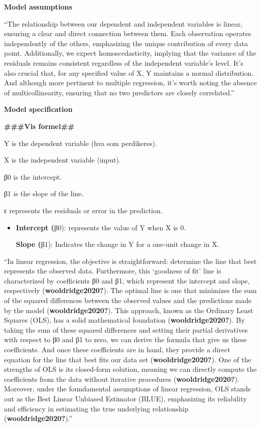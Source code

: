 \documentclass[
  a4paper,
  DIV=11,
  numbers=noendperiod]{scrartcl}
\begin{document}
\textbf{Model assumptions}

``The relationship between our dependent and independent variables is
linear, ensuring a clear and direct connection between them. Each
observation operates independently of the others, emphasizing the unique
contribution of every data point. Additionally, we expect
homoscedasticity, implying that the variance of the residuals remains
consistent regardless of the independent variable's level. It's also
crucial that, for any specified value of X, Y maintains a normal
distribution. And although more pertinent to multiple regression, it's
worth noting the absence of multicollinearity, ensuring that no two
predictors are closely correlated.''

\textbf{Model specification}

\textbf{\#\#\#Vis formel\#\#}

Y is the dependent variable (hva som perdikeres).

X is the independent variable (input).

β0\hspace{0pt} is the intercept.

β1\hspace{0pt} is the slope of the line.

ε represents the residuals or error in the prediction.

\begin{itemize}
\item
  \textbf{Intercept (}β0\hspace{0pt}): represents the value of Y when X
  is 0.

  \textbf{Slope (}β1\hspace{0pt}): Indicates the change in Y for a
  one-unit change in X.
\end{itemize}

``In linear regression, the objective is straightforward: determine the
line that best represents the observed data. Furthermore, this `goodness
of fit' line is characterized by coefficients β0\hspace{0pt} and β1,
which represent the intercept and slope, respectively
(\textbf{wooldridge2020?}). The optimal line is one that minimizes the
sum of the squared differences between the observed values and the
predictions made by the model (\textbf{wooldridge2020?}). This approach,
known as the Ordinary Least Squares (OLS), has a solid mathematical
foundation (\textbf{wooldridge2020?}). By taking the sum of these
squared differences and setting their partial derivatives with respect
to β0\hspace{0pt} and β1 to zero, we can derive the formula that give us
these coefficients. And once these coefficients are in hand, they
provide a direct equation for the line that best fits our data set
(\textbf{wooldridge2020?}). One of the strengths of OLS is its
closed-form solution, meaning we can directly compute the coefficients
from the data without iterative procedures (\textbf{wooldridge2020?}).
Moreover, under the foundamental assumptions of linear regression, OLS
stands out as the Best Linear Unbiased Estimator (BLUE), emphasizing its
reliability and efficiency in estimating the true underlying
relationship (\textbf{wooldridge2020?}).''
\end{document}
